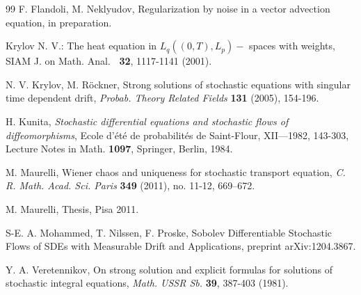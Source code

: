 \documentclass{article}
\begin{document}
\begin{thebibliography}{99}
F. Flandoli, M. Neklyudov, Regularization by noise in a vector
advection equation, in preparation.

  Krylov N. V.: The heat equation in $L_{q}((0,T),L_{p})-$%
 spaces with weights, SIAM J. on Math. Anal. \textbf{\ 32}, 1117-1141 (2001).



N. V. Krylov, M. R\"{o}ckner, Strong solutions of stochastic
equations with singular time dependent drift, \textit{Probab. Theory Related
Fields} \textbf{131} (2005), 154-196.

H. Kunita, \textit{Stochastic differential equations and
stochastic flows of diffeomorphisms}, Ecole d'\'{e}t\'{e} de probabilit\'{e}s
de Saint-Flour, XII---1982, 143-303, Lecture Notes in Math. \textbf{1097},
Springer, Berlin, 1984.

M. Maurelli, Wiener chaos and uniqueness for stochastic
transport equation, \textit{C. R. Math. Acad. Sci. Paris} \textbf{349} (2011),
no. 11-12, 669--672.

M. Maurelli, Thesis, Pisa 2011.

 S-E. A. Mohammed, T. Nilssen, F. Proske, Sobolev Differentiable
Stochastic Flows of SDEs with Measurable Drift and Applications, preprint  arXiv:1204.3867.


Y. A. Veretennikov, On strong solution and explicit formulas for
solutions of stochastic integral equations, \textit{Math. USSR Sb.}
\textbf{39}, 387-403 (1981).
\end{thebibliography}
\end{document}
